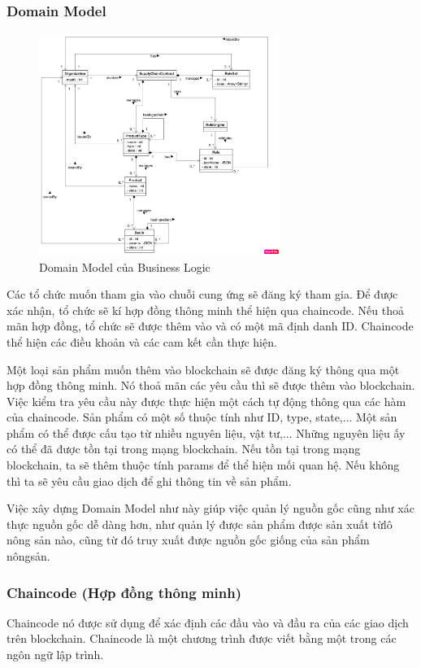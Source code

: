 \subsubsection{Domain Model}

\begin{figure}[h]
    \centering
    \includegraphics[width=0.7\textwidth]{images/domain_model.png}
    \caption{Domain Model của Business Logic \cite{app}} 
\end{figure}

Các tổ chức muốn tham gia vào chuỗi cung ứng sẽ đăng ký tham gia. Để được xác nhận, 
tổ chức sẽ kí hợp đồng thông minh thể hiện qua chaincode. Nếu thoả mãn hợp đồng, 
tổ chức sẽ được thêm vào và có một mã định danh ID. Chaincode thể hiện các điều khoản
và các cam kết cần thực hiện. 

Một loại sản phẩm muốn thêm vào blockchain sẽ được đăng ký thông qua một hợp đồng 
thông minh. Nó thoả mãn các yêu cầu thì sẽ được thêm vào blockchain. Việc kiểm tra 
yêu cầu này được thực hiện một cách tự động thông qua các hàm của chaincode. Sản phẩm có một 
số thuộc tính như ID, type, state,...
Một sản phẩm có thể được cấu tạo từ nhiều nguyên liệu, vật tư,... Những nguyên liệu ấy
có thể đã được tồn tại trong mạng blockchain. Nếu tồn tại trong mạng blockchain, ta sẽ thêm 
thuộc tính params để thể hiện mối quan hệ. Nếu không thì ta sẽ yêu cầu giao dịch
để ghi thông tin về sản phẩm. 

Việc xây dựng Domain Model như này giúp việc quản lý nguồn gốc cũng như xác thực nguồn gốc 
dễ dàng hơn, như quản lý được sản phẩm được sản xuất từlô nông sản nào, cũng từ đó truy xuất được nguồn gốc giống của sản phẩm nôngsản.
\subsubsection{Chaincode (Hợp đồng thông minh)}
Chaincode nó được sử dụng để xác định các đầu vào và đầu ra của các giao dịch trên blockchain. Chaincode là một chương trình được 
viết bằng một trong các ngôn ngữ lập trình.

